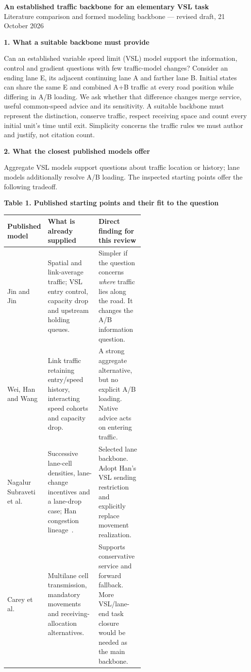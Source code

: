 \documentclass[11pt,a4paper]{article}
\newcommand{\head}[1]{\par\vspace{5pt}\noindent\textbf{#1}\par\nobreak\vspace{1pt}}
\begin{document}
\begin{center}
{\large\bfseries An established traffic backbone for an elementary VSL task}\\[3pt]
Literature comparison and formed modeling backbone --- revised draft, 21 October 2026
\end{center}
\vspace{-3pt}

\head{1. What a suitable backbone must provide}
Can an established variable speed limit (VSL) model support the information,
control and gradient questions with few traffic-model changes? Consider an
ending lane E, its adjacent continuing lane A and farther lane B. Initial
states can share the same E and combined A+B traffic at every road position
while differing in A/B loading. We ask whether that difference changes merge
service, useful common-speed advice and its sensitivity. A suitable backbone
must represent the distinction, conserve traffic, respect receiving space
and count every initial unit's time until exit. Simplicity concerns the
traffic rules we must author and justify, not citation count.

\head{2. What the closest published models offer}
Aggregate VSL models support questions about traffic location or history;
lane models additionally resolve A/B loading. The inspected starting points
offer the following tradeoff.

\begin{center}
\textbf{Table 1. Published starting points and their fit to the question}\par
\vspace{3pt}
\begin{tabularx}{\linewidth}{@{}>{\raggedright\arraybackslash}p{0.19\linewidth}
 >{\raggedright\arraybackslash}p{0.37\linewidth}
 >{\raggedright\arraybackslash}X@{}}
\toprule
Published model & What is already supplied & Direct finding for this review\\
\midrule
Jin and Jin~\cite{jinjin}
& Spatial and link-average traffic; VSL entry control, capacity drop and
upstream holding queues.
& Simpler if the question concerns \emph{where} traffic lies along the
road. It changes the A/B information question.\\[3pt]
Wei, Han and Wang~\cite{wei}
& Link traffic retaining entry/speed history, interacting speed cohorts
and capacity drop.
& A strong aggregate alternative, but no explicit A/B loading. Native
advice acts on entering traffic.\\[3pt]
Nagalur Subraveti et al.~\cite{ns}
& Successive lane-cell densities, lane-change incentives and a lane-drop
case; Han congestion lineage~\cite{han16}.
& Selected lane backbone. Adopt Han's VSL sending restriction~\cite{han17}
and explicitly replace movement realization.\\[3pt]
Carey et al.~\cite{carey}
& Multilane cell transmission, mandatory movements and receiving-allocation
alternatives.
& Supports conservative service and forward fallback. More VSL/lane-end
task closure would be needed as the main backbone.\\
\bottomrule
\end{tabularx}
\end{center}
\end{document}

